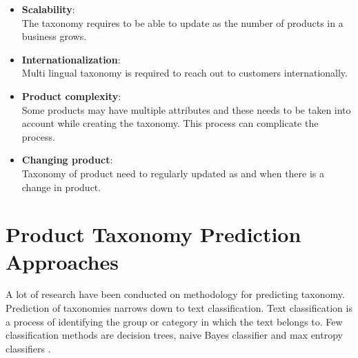 \begin{enumerate}[label=\textbf{Q\arabic*:}]
    \begin{itemize}
        \item \textbf{Scalability}:\\ The taxonomy requires to be able to update as the number of products in a business grows.
        \item \textbf{Internationalization}:\\ Multi lingual taxonomy is required to reach out to customers internationally. 
        \item \textbf{Product complexity}:\\  Some products may have multiple attributes and these needs to be taken into account while creating the taxonomy. This process can complicate the process.
        \item \textbf{Changing product}:\\ Taxonomy of product need to regularly updated as and when there is a change in product. 
    \end{itemize}

\end{enumerate}




\section{Product Taxonomy Prediction Approaches}


A lot of research have been conducted on methodology for predicting taxonomy. Prediction of taxonomies narrows down to text classification. Text classification is a process of identifying the group or category in which the  text belongs to.  Few classification methods are decision trees, naive Bayes classifier and max entropy classifiers \parencite{BirdKleinLoper09}. 


